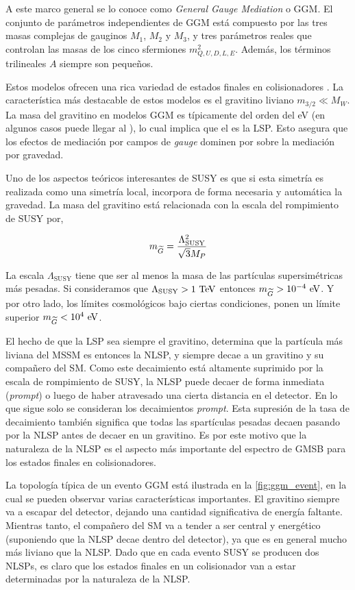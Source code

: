 A este marco general se lo conoce como \emph{General Gauge Mediation} o GGM. El
conjunto de parámetros independientes de GGM está compuesto por las tres masas
complejas de gauginos $M_1$, $M_2$ y $M_3$, y tres parámetros reales que
controlan las masas de los cinco sfermiones $m^2_{Q,U,D,L,E}$. Además, los términos
trilineales $A$ siempre son pequeños.

Estos modelos ofrecen una rica variedad de estados finales en colisionadores
\cite{0911.4130}. La característica más destacable de estos modelos es el
gravitino liviano $m_{3/2} \ll M_W$. La masa del gravitino en modelos
GGM es típicamente del orden del eV (en algunos casos puede llegar al \gev), lo
cual implica que el {\gravino} es la LSP. Esto asegura que los efectos de
mediación por campos de \emph{gauge} dominen por sobre la mediación por gravedad.

Uno de los aspectos teóricos interesantes de SUSY es que si esta simetría es
realizada como una simetría local, incorpora de forma necesaria y automática la
gravedad.
La masa del gravitino está relacionada con la escala del rompimiento de SUSY por,

\begin{equation}
  m_{\widetilde{G}} = \frac{\Lambda^2_{\text{SUSY}}}{\sqrt{3}M_P}
\end{equation}

La escala $\Lambda_{\text{SUSY}}$ tiene que ser al menos la masa de las
partículas supersimétricas más pesadas. Si consideramos que
$\Lambda_{\text{SUSY}} > 1 \tev$ entonces $m_{\gravino} > 10^{-4} \eV$.
Y por otro lado, los límites cosmológicos \cite{PhysRevLett.48.223,Moroi:1993mb}
bajo ciertas condiciones, ponen un límite superior $m_{\gravino} < 10^4 \eV$.

El hecho de que la LSP sea siempre el gravitino, determina que la partícula más
liviana del MSSM es entonces la NLSP, y siempre decae a un gravitino y su
compañero del SM. Como este decaimiento está altamente suprimido por la escala
de rompimiento de SUSY, la NLSP puede decaer de forma inmediata (\emph{prompt})
o luego de haber atravesado una cierta distancia en el detector. En lo que sigue
solo se consideran los decaimientos \emph{prompt}. Esta supresión de la tasa
de decaimiento también significa que todas las spartículas pesadas decaen
pasando por la NLSP antes de decaer en un gravitino. Es por este motivo que la
naturaleza de la NLSP es el aspecto más importante del espectro de GMSB para los
estados finales en colisionadores.

La topología típica de un evento GGM está ilustrada en la \cref{fig:ggm_event},
en la cual se pueden observar varias características importantes. El gravitino
siempre va a escapar del detector, dejando una cantidad significativa de energía
faltante. Mientras tanto, el compañero del SM va a tender a ser central y
energético (suponiendo que la NLSP decae dentro del detector), ya que es en
general mucho más liviano que la NLSP. Dado que en cada evento SUSY se producen
dos NLSPs, es claro que los estados finales en un colisionador van a estar
determinadas por la naturaleza de la NLSP.


